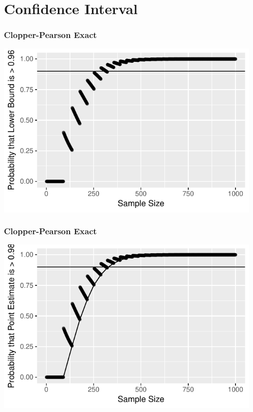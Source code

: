 \documentclass{beamer}\usepackage{knitr}
\begin{document}
\section{Confidence Interval}



\begin{frame}
\frametitle{Clopper-Pearson Exact}
\begin{knitrout}
\color{fgcolor}

{\centering \includegraphics[width=\linewidth]{figure/plot_Exact_1-1} 

}



\end{knitrout}
\end{frame}

\begin{frame}
\frametitle{Clopper-Pearson Exact}
\begin{knitrout}
\color{fgcolor}

{\centering \includegraphics[width=\linewidth]{figure/plot_Exact_2-1} 

}



\end{knitrout}
\end{frame}
\end{document}
